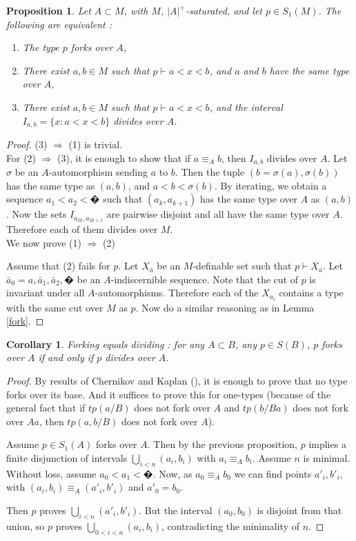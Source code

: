 \documentclass[english]{article}
\newtheorem{cor}[thm]{Corollary}
\newtheorem{prop}[thm]{Proposition}
\theoremstyle{definition}
\theoremstyle{mystyle}
\theoremstyle{remark}
\begin{document}
\begin{prop}\label{convfk}
Let $A \subset M$, with $M$, $|A|^+$-saturated, and let $p \in S_1(M)$. The following are equivalent :
\begin{enumerate}
\item The type $p$ forks over $A$,
\item There exist $a,b \in M$ such that $p\vdash a < x < b$, and $a$ and $b$ have the same type over $A$,
\item There exist $a,b \in M$ such that $p\vdash a<x<b$, and the interval $I_{a,b}= \{x : a<x<b\}$ divides over $A$.
\end{enumerate}
\end{prop}
\begin{proof}
(3) $\Rightarrow$ (1) is trivial.
\\

For (2) $\Rightarrow$ (3), it is enough to show that if $a \equiv_A b$, then $I_{a,b}$ divides over $A$. Let $\sigma$ be an $A$-automorphism sending $a$ to $b$. Then the tuple $(b=\sigma(a),\sigma(b))$ has the same type as $(a,b)$, and $a < b < \sigma(b)$. By iterating, we obtain a sequence $a_1 < a_2 < � $ such that $(a_k,a_{k+1})$ has the same type over $A$ as $(a,b)$. Now the sets $I_{a_{2k},a_{2k+1}}$ are pairwise disjoint and all have the same type over $A$. Therefore each of them divides over $M$.
\\

We now prove (1) $\Rightarrow$ (2)

Assume that (2) fails for $p$. Let $X_{\bar a}$ be an $M$-definable set such that $p\vdash X_{\bar a}$. Let $\bar a_0 = a, \bar a_1,\bar a_2, �$ be an $A$-indiscernible sequence. Note that the cut of $p$ is invariant under all $A$-automorphisms. Therefore each of the $X_{\bar a_i}$ contains a type with the same cut over $M$ as $p$. Now do a similar reasoning as in Lemma \ref{fork}.
\end{proof}

\begin{cor}
Forking equals dividing : for any $A \subset B$, any $p\in S(B)$, $p$ forks over $A$ if and only if $p$ divides over $A$.
\end{cor}
\begin{proof}
By results of Chernikov and Kaplan (\cite{CK}), it is enough to prove that no type forks over its base. And it suffices to prove this for one-types (because of the general fact that if $tp(a/B)$ does not fork over $A$ and $tp(b/Ba)$ does not fork over $Aa$, then $tp(a,b/B)$ does not fork over $A$).

Assume $p\in S_1(A)$ forks over $A$. Then by the previous proposition, $p$ implies a finite disjunction of intervals $\bigcup_{i<n} (a_i,b_i)$ with $a_i \equiv_A b_i$. Assume $n$ is minimal. Without loss, assume $a_0 < a_1 < � $. Now, as $a_0 \equiv_A b_0$ we can find points $a'_i, b'_i$, with $(a_i,b_i) \equiv_A (a'_i,b'_i)$ and $a'_0 = b_0$.

Then $p$ proves $\bigcup_{i<n} (a'_i,b'_i)$. But the interval $(a_0, b_0)$ is disjoint from that union, so $p$ proves $\bigcup_{0<i<n} (a_i,b_i)$, contradicting the minimality of $n$.
\end{proof}
\end{document}
